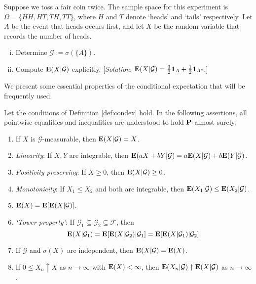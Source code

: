 \begin{exercise}
    Suppose we toss a fair coin twice. The sample space for this experiment is $\Omega=\{HH, HT, TH, TT\}$, where $H$ and $T$ denote `heads' and `tails' respectively. Let $A$ be the event that heads occurs first, and let $X$ be the random variable that records the number of heads.
    \begin{enumerate}[(i)]
        \item Determine $\mathcal{G}:=\sigma(\{A\})$.
        \item Compute $\mathbf{E}(X|\mathcal{G})$ explicitly. [\emph{Solution}: $\mathbf{E}(X|\mathcal{G}) = \frac{3}{2}\mathbf{1}_A + \frac{1}{2}\mathbf{1}_{A^c}$.]
    \end{enumerate}
\end{exercise}

We present some essential properties of the conditional expectation that will be frequently used.
\begin{proposition}
Let the conditions of Definition \ref{def:condex} hold. In the following assertions, all pointwise equalities and inequalities are understood to hold $\mathbf{P}$-almost surely.
\begin{enumerate}[\upshape (i)]
    \item If $X$ is $\mathcal{G}$-measurable, then $\mathbf{E}(X|\mathcal{G}) = X$.
    
    \item \emph{Linearity}: If $X, Y$ are integrable, then $\mathbf{E}(aX + bY | \mathcal{G}) = a \mathbf{E}(X|\mathcal{G}) + b \mathbf{E}(Y|\mathcal{G})$.
    
    \item \emph{Positivity preserving}: If $X \ge 0$, then $\mathbf{E}(X|\mathcal{G}) \ge 0$.
    
    \item \emph{Monotonicity}: If $X_1 \le X_2$ and both are integrable, then $\mathbf{E}(X_1|\mathcal{G}) \le \mathbf{E}(X_2|\mathcal{G})$.
    
    \item $\mathbf{E}(X) = \mathbf{E}[\mathbf{E}(X |\mathcal{G})]$.

    \item \emph{`Tower property'}: If $\mathcal{G}_1\subseteq\mathcal{G}_2\subseteq\mathcal{F}$, then
    \begin{equation*}
        \mathbf{E}(X|\mathcal{G}_1) = \mathbf{E}[\mathbf{E}(X|\mathcal{G}_2)|\mathcal{G}_1] = \mathbf{E}[ \mathbf{E}(X|\mathcal{G}_1) | \mathcal{G}_2 ].
    \end{equation*}
    
    \item If $\mathcal{G}$ and $\sigma(X)$ are independent, then $\mathbf{E}(X |\mathcal{G}) = \mathbf{E}(X)$.
    
    \item If $0 \le X_n \uparrow X$ as $n\to\infty$ with $\mathbf{E}(X) < \infty$, then $\mathbf{E}(X_n |\mathcal{G}) \uparrow \mathbf{E}(X|\mathcal{G})$ as $n\to\infty$.
\end{enumerate}
\end{proposition}

